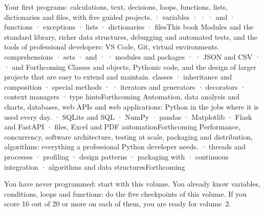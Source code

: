   {Your first programs: calculations, text, decisions, loops, functions, lists, dictionaries and
   files, with five guided projects.}
  { · variables ·  ·  ·  and  · functions ·
   exceptions · lists · dictionaries · files}{This book}
  {Modules and the standard library, richer data structures, debugging and automated tests, and the
   tools of professional developers: VS Code, Git, virtual environments.}
  {comprehensions · sets ·  and  ·  · modules and packages ·
    · JSON and CSV ·  ·  and }{Forthcoming}
  {Classes and objects, Pythonic code, and the design of larger projects that are easy to extend and
   maintain.}
  {classes · inheritance and composition · special methods ·  · iterators and
   generators · decorators · context managers · type hints}{Forthcoming}
  {Automation, data analysis and charts, databases, web APIs and web applications: Python in the
   jobs where it is used every day.}
  { · SQLite and SQL · NumPy · pandas · Matplotlib · Flask and FastAPI · files, Excel
   and PDF automation}{Forthcoming}
  {Performance, concurrency, software architecture, testing at scale, packaging and distribution,
   algorithms: everything a professional Python developer needs.}
  { · threads and processes · profiling · design patterns · packaging with
    · continuous integration · algorithms and data structures}{Forthcoming}

\begin{astuce}
You have never programmed: start with this volume. You already know variables, conditions, loops
and functions: do the five checkpoints of this volume. If you score 16 out of 20 or more on each of
them, you are ready for volume~2.
\end{astuce}
